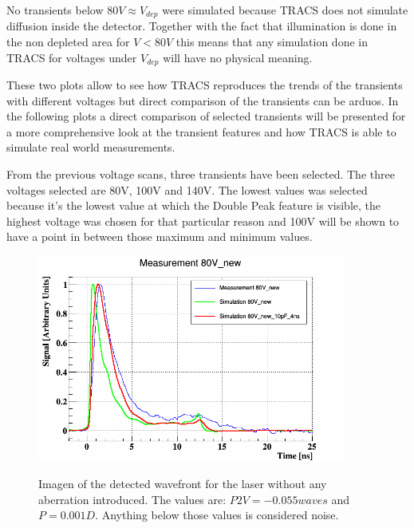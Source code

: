 No transients below $80V \approx V_{dep}$ were simulated because TRACS does not simulate diffusion inside the detector. Together with the fact that illumination is done in the non depleted area for $V < 80V$ this means that any simulation done in TRACS for voltages under $V_{dep}$ will have no physical meaning.

These two plots allow to see how TRACS reproduces the trends of the transients with different voltages but direct comparison of the transients can be arduos. In the following plots a direct comparison of selected transients will be presented for a more comprehensive look at the transient features and how TRACS is able to simulate real world measurements.

From the previous voltage scans, three transients have been selected. The three voltages selected are 80V, 100V and 140V. The lowest values was selected because it's the lowest value at which the Double Peak feature is visible, the highest voltage was chosen for that particular reason and 100V will be shown to have a point in between those maximum and minimum values.

\begin{figure}[H]
	\centering
	\includegraphics[width=0.9\textwidth]{80V.png}
	\label{fig:mues2}
	\caption{Imagen of the detected wavefront for the laser without any aberration introduced. The values are: $P2V = -0.055waves$ and $P = 0.001D$. Anything below those values is considered noise.}
\end{figure}


